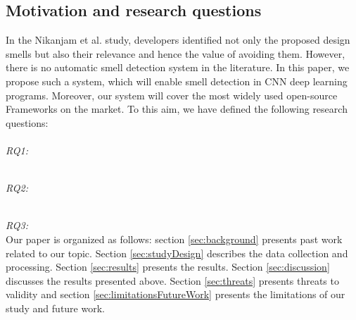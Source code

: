 \subsection{Motivation and research questions}
In the Nikanjam et al. study, developers identified not only the proposed design smells but also their relevance and hence the value of avoiding them. However, there is no automatic smell detection system in the literature. In this paper, we propose such a system, which will enable smell detection in CNN deep learning programs. Moreover, our system will cover the most widely used open-source Frameworks on the market. To this aim, we have defined the following research questions:\\

\emph{\\RQ1:\RQOne} %

\emph{\\RQ2:\RQTwo} %

\emph{\\RQ3:\RQThree}\\ %

Our paper is organized as follows: section \ref{sec:background} presents past work related to our topic. Section \ref{sec:studyDesign} describes the data collection and processing. Section \ref{sec:results} presents the results. Section \ref{sec:discussion} discusses the results presented above. Section \ref{sec:threats} presents threats to validity and section \ref{sec:limitationsFutureWork} presents the limitations of our study and future work.
